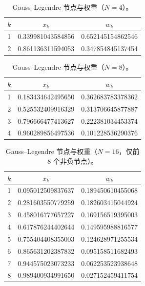 \begin{table}[h]
\centering
\caption{Gauss--Legendre 节点与权重（$N=4$）。}
\label{tab:appC:gl_N4}
\begin{tabular}{c S[table-format=1.15] S[table-format=1.15]}
\toprule
$k$ & {$x_k$} & {$w_k$} \\
 & 0.339981043584856 & 0.652145154862546 \\
2 & 0.861136311594053 & 0.347854845137454 \\
\bottomrule
\end{tabular}
\end{table}

\begin{table}[h]
\centering
\caption{Gauss--Legendre 节点与权重（$N=8$）。}
\label{tab:appC:gl_N8}
\begin{tabular}{c S[table-format=1.15] S[table-format=1.15]}
\toprule
$k$ & {$x_k$} & {$w_k$} \\
 & 0.183434642495650 & 0.362683783378362 \\
2 & 0.525532409916329 & 0.313706645877887 \\
3 & 0.796666477413627 & 0.222381034453374 \\
4 & 0.960289856497536 & 0.101228536290376 \\
\bottomrule
\end{tabular}
\end{table}

\begin{table}[h]
\centering
\caption{Gauss--Legendre 节点与权重（$N=16$，仅前 8 个非负节点）。}
\label{tab:appC:gl_N16}
\begin{tabular}{c S[table-format=1.15] S[table-format=1.15]}
\toprule
$k$ & {$x_k$} & {$w_k$} \\
 & 0.095012509837637 & 0.189450610455068 \\
2 & 0.281603550779259 & 0.182603415044924 \\
3 & 0.458016777657227 & 0.169156519395003 \\
4 & 0.617876244402644 & 0.149595988816577 \\
5 & 0.755404408355003 & 0.124628971255534 \\
6 & 0.865631202387832 & 0.095158511682493 \\
7 & 0.944575023073233 & 0.062253523938648 \\
8 & 0.989400934991650 & 0.027152459411754 \\
\bottomrule
\end{tabular}
\end{table}

